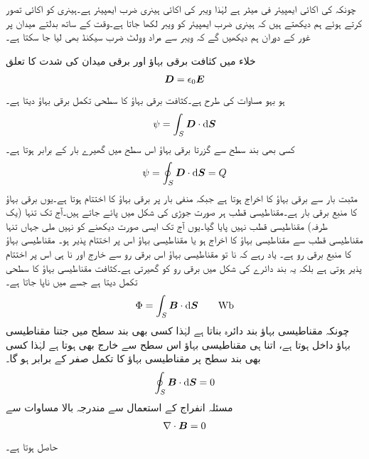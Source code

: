 چونکہ  کی اکائی ایمپیئر فی میٹر ہے لہٰذا ویبر کی اکائی ہینری ضرب ایمپیئر ہے۔ہینری کو اکائی تصور کرتے ہوئے ہم دیکھتے ہیں کہ ہینری ضرب ایمپیئر کو ویبر لکھا جاتا ہے۔وقت کے ساتھ بدلتے میدان پر غور کے دوران ہم دیکھیں گے کہ ویبر سے مراد وولٹ ضرب سیکنڈ بھی لیا جا سکتا ہے۔ 

خلاء میں کثافت برقی بہاؤ  اور برقی میدان کی شدت  کا تعلق
\begin{align*}
{\ensuremath{{\boldsymbol{D}}}}=\epsilon_0 {{\boldsymbol{E}}}
\end{align*}
ہو بہو مساوات  کی طرح ہے۔کثافت برقی بہاؤ کا سطحی تکمل برقی بہاؤ  دیتا ہے۔
\begin{align*}
\psi=\int_S \kvec{D} \cdot \dif \kvec{S}
\end{align*}
کسی بھی بند سطح سے گزرتا برقی بہاؤ اس سطح میں گھیرے بار  کے برابر ہوتا ہے۔
\begin{align*}
\psi=\oint_S \kvec{D} \cdot \dif \kvec{S}=Q
\end{align*}
مثبت بار سے برقی بہاؤ کا اخراج ہوتا ہے جبکہ منفی بار پر برقی بہاؤ کا اختتام ہوتا ہے۔یوں برقی بہاؤ کا منبع برقی بار ہے۔مقناطیسی قطب ہر صورت جوڑی کی شکل میں پائے جاتے ہیں۔آج تک تنہا (یک طرفہ) مقناطیسی قطب نہیں پایا گیا۔یوں آج تک ایسی صورت دیکھنے کو نہیں ملی جہاں تنہا مقناطیسی قطب سے مقناطیسی بہاؤ کا اخراج ہو یا مقناطیسی بہاؤ اس پر اختتام پذیر ہو۔ مقناطیسی بہاؤ کا منبع برقی رو ہے۔ یاد رہے کہ نا تو مقناطیسی بہاؤ اس برقی رو سے خارج اور نا ہی اس پر اختتام پذیر ہوتی ہے بلکہ یہ بند دائرے کی شکل میں برقی رو کو گھیرتی ہے۔کثافت مقناطیسی بہاؤ کا سطحی تکمل   دیتا ہے جسے   میں ناپا جاتا ہے۔
\begin{align}
\Phi=\int_S \kvec{B} \cdot \dif \kvec{S} \quad \quad \si{\weber}
\end{align} 
چونکہ مقناطیسی بہاؤ بند دائرہ بناتا ہے لہٰذا کسی بھی بند سطح میں جتنا مقناطیسی بہاؤ داخل ہوتا ہے، اتنا ہی مقناطیسی بہاؤ اس سطح سے خارج بھی ہوتا ہے لہٰذا کسی بھی بند سطح پر مقناطیسی بہاؤ کا تکمل صفر کے برابر ہو گا۔
\begin{align}\label{مساوات_مقناطیسی_مقناطیسی_بہاو_بند_سطح}
\oint_S \kvec{B} \cdot \dif \kvec{S}=0
\end{align}
مسئلہ انفراج کے استعمال سے مندرجہ بالا مساوات سے
\begin{align}\label{مساوات_مقناطیسی_مقناطیسی_بہاو_پھیلاو}
\nabla \cdot {\ensuremath{{\boldsymbol{B}}}}=0
\end{align}
حاصل ہوتا ہے۔

